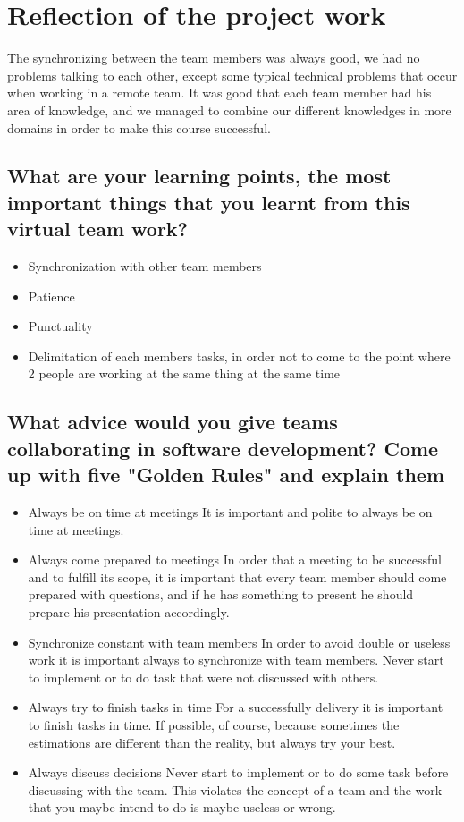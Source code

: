 
\chapter{Reflection of the project work} %

The synchronizing between the team members was always good, we had no problems talking to each other, except some typical technical problems that occur when working in a remote team.
It was good that each team member had his area of knowledge, and we managed to combine our different knowledges in more domains in order to make this course successful.

\section{What are your learning points, the most important things that you learnt from this virtual team work?}
\begin{itemize}
\item Synchronization with other team members
\item Patience
\item Punctuality
\item Delimitation of each members tasks, in order not to come to the point where 2 people are working at the same thing at the same time
\end{itemize}

\section{What advice would you give teams collaborating in software development? Come up with five "Golden Rules" and explain them}

\begin{itemize}
	\item  Always be on time at meetings
	It is important and polite to always be on time at meetings.
	\item  Always come prepared to meetings
	In order that a meeting to be successful and to fulfill its scope, it is important that every team member should come prepared with questions, and if he has something to present he should prepare his presentation accordingly. 
	\item  Synchronize constant with team members
	In order to avoid double or useless work it is important always to synchronize with team members. Never start to implement or to do task that were not discussed with others.
	\item Always try to finish tasks in time
	For a successfully delivery it is important to finish tasks in time. If possible, of course, because sometimes the estimations are different than the reality, but always try your best.
	\item Always discuss decisions 
	Never start to implement or to do some task before discussing with the team. This violates the concept of a team and the work that you maybe intend to do is maybe useless or wrong.
\end{itemize}